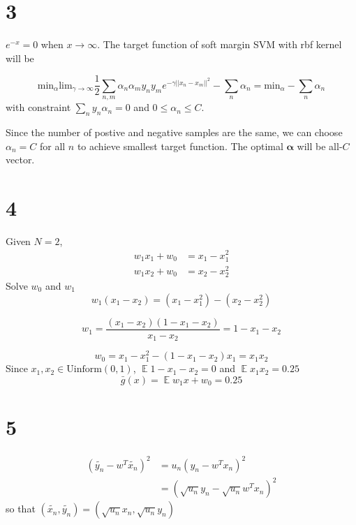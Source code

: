 \documentclass[12pt]{article}
\DeclareMathOperator{\E}{\mathbb{E}}
\begin{document}
\section*{3}
$e^{-x} = 0$ when $x\rightarrow\infty$. The target function of soft margin SVM with rbf kernel will be 

$$
\text{min}_\alpha \text{lim}_{\gamma \rightarrow \infty}\frac{1}{2} \sum_{n,m} \alpha_n\alpha_my_ny_me^{-\gamma||x_n-x_m||^2} - \sum_n \alpha_n
= \text{min}_\alpha -\sum_n\alpha_n
$$
with constraint $\sum_n y_n \alpha_n = 0$ and $0 \leq \alpha_n \leq C$.

Since the number of postive and negative samples are the same, 
we can choose $\alpha_n = C$ for all $n$ to achieve smallest target function.
The optimal $\bm{\alpha}$ will be all-$C$ vector.
\section*{4}
Given $N=2$,
\begin{equation*}
    \begin{split}
        w_1 x_1 + w_0 &= x_1 - x_1^2 \\
        w_1 x_2 + w_0 &= x_2 - x_2^2
    \end{split}
\end{equation*}
Solve $w_0$ and $w_1$ 
\[
    w_1(x_1 - x_2) = (x_1 - x_1^2) - (x_2 - x_2^2)
\]

\[
    w_1 = \frac{(x_1 - x_2) (1-x_1-x_2)}{x_1-x_2} = 1-x_1-x_2
\]

\[
    w_0 = x_1 - x_1^2 - (1 - x_1 - x_2) x_1 = x_1 x_2
\]
Since $x_1, x_2 \in \text{Uinform}(0, 1)$, $\E 1-x_1-x_2 = 0$ and $\E x_1x_2 = 0.25$
\[
    \bar{g}(x) = \E w_1 x + w_0 = 0.25 
\]
\section*{5}

\begin{equation*}
\begin{split}
    (\tilde{y_n} - w^T \tilde{x_n})^2 &= u_n (y_n - w^Tx_n)^2 \\
    &=  (\sqrt{u_n} y_n - \sqrt{u_n}w^Tx_n)^2
\end{split}
\end{equation*}
so that $(\tilde{x_n}, \tilde{y_n}) = (\sqrt{u_n}x_n, \sqrt{u_n}y_n)$
\end{document}
